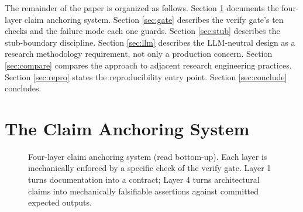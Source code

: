 \documentclass[twocolumn,10pt,a4paper]{article}
\begin{document}
The remainder of the paper is organized as follows. Section \ref{sec:anchoring} documents the four-layer claim anchoring system. Section \ref{sec:gate} describes the verify gate's ten checks and the failure mode each one guards. Section \ref{sec:stub} describes the stub-boundary discipline. Section \ref{sec:llm} describes the LLM-neutral design as a research methodology requirement, not only a production concern. Section \ref{sec:compare} compares the approach to adjacent research engineering practices. Section \ref{sec:repro} states the reproducibility entry point. Section \ref{sec:conclude} concludes.

\section{The Claim Anchoring System}
\label{sec:anchoring}

\begin{figure}[t]
\centering
{}
\caption{Four-layer claim anchoring system (read bottom-up). Each layer is mechanically enforced by a specific check of the verify gate. Layer 1 turns documentation into a contract; Layer 4 turns architectural claims into mechanically falsifiable assertions against committed expected outputs.}
\label{fig:fourlayer}
\end{figure}
\end{document}
